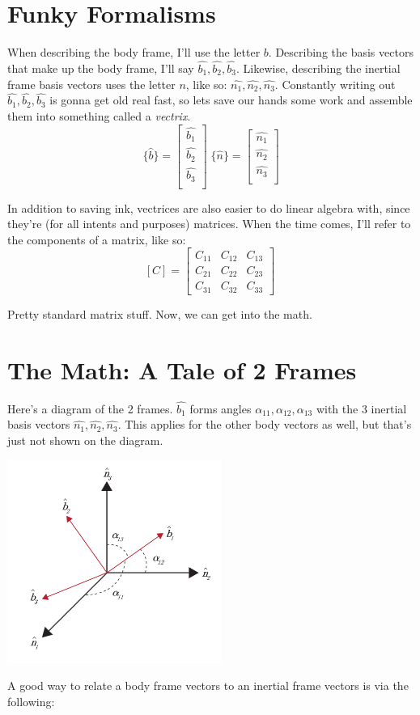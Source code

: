\documentclass[a4paper,14pt]{extreport}
\newcommand{\bv}[1]{\hat{b_{#1}}}
\newcommand{\nv}[1]{\hat{n_{#1}}}
\begin{document}
\section{Funky Formalisms}
When describing the body frame, I'll use the letter $b$. Describing the basis vectors that make up the body frame, I'll say $\bv{1}, \bv{2}, \bv{3}$. Likewise, describing the inertial frame basis vectors uses the letter $n$, like so: $\nv{1}, \nv{2}, \nv{3}$. Constantly writing out $\bv{1}, \bv{2}, \bv{3}$ is gonna get old real fast, so lets save our hands some work and assemble them into something called a \emph{vectrix}.
\[
\{\hat{b}\} = 
\begin{bmatrix}
\bv{1}\\ \bv{2}\\ \bv{3}\\
\end{bmatrix}\;
\{\hat{n}\} = 
\begin{bmatrix}
\nv{1}\\ \nv{2}\\ \nv{3}\\
\end{bmatrix}
\] 

In addition to saving ink, vectrices are also easier to do linear algebra with, since they're (for all intents and purposes) matrices. When the time comes, I'll refer to the components of a matrix, like so:
\[
[C] = \begin{bmatrix}
C_{11}&C_{12}&C_{13}\\
C_{21}&C_{22}&C_{23}\\
C_{31}&C_{32}&C_{33}
\end{bmatrix}\
\]

Pretty standard matrix stuff. Now, we can get into the math.
\section{The Math: A Tale of 2 Frames}
Here's a diagram of the 2 frames. $\bv{1}$ forms angles $\alpha_{11}, \alpha_{12}, \alpha_{13}$ with the 3 inertial basis vectors $\nv{1},\nv{2},\nv{3}$. This applies for the other body vectors as well, but that's just not shown on the diagram.
\begin{center}
\includegraphics[width=7cm]{dcmalpha}
\end{center}
A good way to relate a body frame vectors to an inertial frame vectors is via the following:
\end{document}
